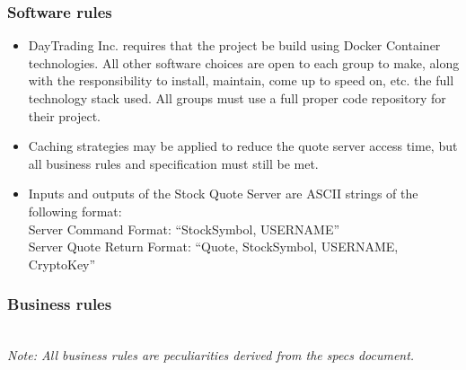 \documentclass[a4paper,10pt]{article}
\begin{document}
\subsubsection{Software rules}
\begin{itemize}
\item DayTrading Inc. requires that the project be build using Docker 
Container technologies. All other software choices are open to each group to 
make, along with the responsibility to install, maintain, come up to speed on, 
etc. the full technology stack used. All groups must use a full proper code 
repository for their project.
\item Caching strategies may be applied to reduce the quote server access time, 
but all business rules and specification must still be met.
\item Inputs and outputs of the Stock Quote Server are ASCII strings of the 
following format:
\\Server Command Format: “StockSymbol, USERNAME”
\\Server Quote Return Format: “Quote, StockSymbol, USERNAME, CryptoKey”
\end{itemize}


\subsubsection{Business rules}
\textit{\\Note: All business rules are peculiarities derived from the specs
document.}
\end{document}
